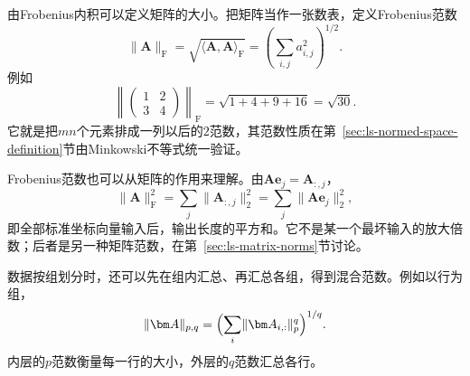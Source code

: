 由Frobenius内积可以定义矩阵的大小。把矩阵当作一张数表，定义Frobenius范数
\begin{equation}
 \lVert\bm A\rVert_{\mathrm F}=\sqrt{\langle\bm A,\bm A\rangle_{\mathrm F}}=\left(\sum_{i,j}a_{i,j}^2\right)^{1/2}.
 \label{eq:ls-frobenius-norm}
\end{equation}
例如
\[
 \left\lVert\begin{pmatrix}1&2\\3&4\end{pmatrix}\right\rVert_{\mathrm F}=\sqrt{1+4+9+16}=\sqrt{30}.
\]
它就是把$mn$个元素排成一列以后的$2$范数，其范数性质在第~\ref{sec:ls-normed-space-definition}节由Minkowski不等式统一验证。

Frobenius范数也可以从矩阵的作用来理解。由$\bm A\bm e_j=\bm A_{:,j}$，
\[
 \lVert\bm A\rVert_{\mathrm F}^2=\sum_j\lVert\bm A_{:,j}\rVert_2^2=\sum_j\lVert\bm A\bm e_j\rVert_2^2,
\]
即全部标准坐标向量输入后，输出长度的平方和。它不是某一个最坏输入的放大倍数；后者是另一种矩阵范数，在第~\ref{sec:ls-matrix-norms}节讨论。

数据按组划分时，还可以先在组内汇总、再汇总各组，得到混合范数。例如以行为组，
\[
 \lVert\bm A\rVert_{p,q}=\Bigl(\sum_i\lVert\bm A_{i,:}\rVert_p^q\Bigr)^{1/q}.
\]
内层的$p$范数衡量每一行的大小，外层的$q$范数汇总各行。
